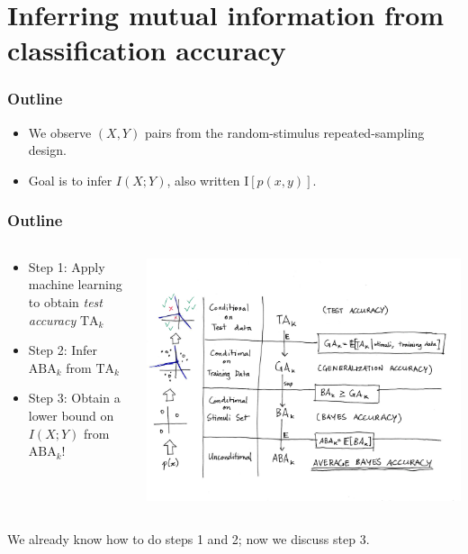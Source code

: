 \documentclass{beamer}
\begin{document}
\section{Inferring mutual information from classification accuracy}

\begin{frame}
\sectionpage
\end{frame}

\begin{frame}
\frametitle{Outline}
\begin{itemize}
\item We observe $(X, Y)$ pairs from the random-stimulus repeated-sampling design.
\item Goal is to infer $I(X; Y)$, also written $\text{I}[p(x, y)]$.
\end{itemize}
\end{frame}

\begin{frame}
\frametitle{Outline}
\begin{columns}
\begin{column}{0.5\textwidth}
\begin{itemize}
\item Step 1: Apply machine learning to obtain \emph{test accuracy} $\text{TA}_k$
\item Step 2: Infer $\text{ABA}_k$ from $\text{TA}_k$
\item Step 3: Obtain a lower bound on $I(X; Y)$ from $\text{ABA}_k$!
\end{itemize}
\end{column}
\begin{column}{0.5\textwidth}
\begin{center}
\includegraphics[scale = 0.3, clip = true, trim = 0in 1in 5.5in 1in]{ta_to_aba.png}
\end{center}   
\end{column}
\end{columns}
We already know how to do steps 1 and 2; now we discuss step 3.
\end{frame}
\end{document}
